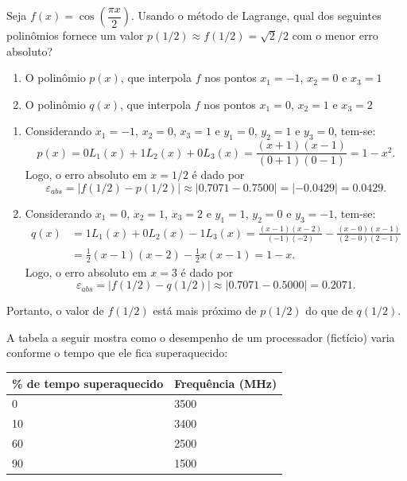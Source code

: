 \documentclass[12pt,a4paper]{article}
\begin{document}
\begin{ExerciseList}
\Exercise[title={2,5}]
Seja $f(x) = \cos\left(\dfrac{ \pi x }{2} \right)$. Usando o método de Lagrange, qual dos seguintes polinômios fornece um valor $p(1/2) \approx f(1/2) = \sqrt{2}/2$ com o menor erro absoluto?
\begin{enumerate}
\item O polinômio $p(x)$, que interpola $f$ nos pontos $x_1 = -1$, $x_2 = 0$ e $x_3 = 1$
\item O polinômio $q(x)$, que interpola $f$ nos pontos $x_1 = 0$, $x_2 = 1$ e $x_3 = 2$
\end{enumerate}
\Answer \begin{enumerate}
\item Considerando $x_1 = -1$,  $x_2 = 0$, $x_3 = 1$ e $y_1 = 0$, $y_2 = 1$ e $y_3 = 0$, tem-se:
\[
p(x)
= 0 L_1(x) + 1 L_2(x) + 0 L_3(x)
= \frac{(x+1)(x-1)}{(0+1)(0-1)}
= 1-x^2.
\]
Logo, o erro absoluto em $x = 1/2$ é dado por
\[
\varepsilon_{abs}
= |f(1/2) - p(1/2)|
\approx |0.7071 - 0.7500|
= |-0.0429| = 0.0429.
\]
\item Considerando $x_1 = 0$, $x_2 = 1$,  $x_3 =  2$ e
                   $y_1 = 1$, $y_2 = 0$ e $y_3 = -1$, tem-se:
\begin{align*}
q(x)
& = 1L_1(x) + 0L_2(x) - 1L_3(x) 
  = \frac{(x - 1)(x - 2)}{(-1)(-2)}
  - \frac{(x - 0)(x - 1) }{(2-0)(2-1)}\\
&  = \frac{1}{2}(x - 1)(x - 2) - \frac{1}{2} x(x - 1)
   = 1 - x.
\end{align*}
Logo, o erro absoluto em $x = 3$ é dado por
\[
\varepsilon_{abs}
= |f(1/2) - q(1/2)|
\approx |0.7071 - 0.5000|
= 0.2071.
\]
\end{enumerate}
Portanto, o valor de $f(1/2)$ está mais próximo de $p(1/2)$ do que de $q(1/2)$.

\Exercise[title={2,5}]
A tabela a seguir mostra como o desempenho de um processador (fictício) varia conforme o tempo que ele fica superaquecido:
\begin{center}
\begin{tabular}{ p{3cm}|p{3.5cm}}
\hline			
\textbf{ \% de tempo \newline superaquecido}
& \textbf{Frequência (MHz)} \\ \hline\hline
 0 & 3500 \\ \hline
10 & 3400 \\ \hline
60 & 2500 \\ \hline
90 & 1500 \\ \hline
\end{tabular}
\end{center}


\end{ExerciseList}
\end{document}
